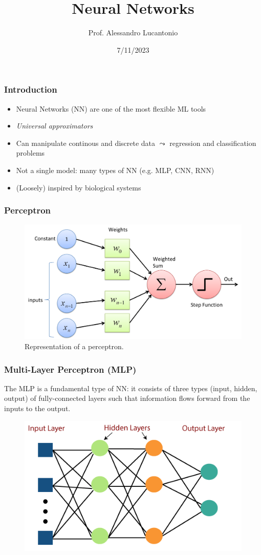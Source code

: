 \documentclass{beamer}
\title{Neural Networks}
\author{Prof. Alessandro Lucantonio}
\institute{Aarhus University}
\date{7/11/2023}
\begin{document}
	\frame{\titlepage}
	
	\begin{frame}
		\frametitle{Introduction}
		\begin{itemize}
			\setlength\itemsep{5mm}
			\item Neural Networks (NN) are one of the most flexible ML tools
			\item \textit{Universal approximators}
			\item Can manipulate continous and discrete data $\leadsto$ regression and classification problems
			\item Not a single model: many types of NN (e.g. MLP, CNN, RNN)
			\item (Loosely) inspired by biological systems
		\end{itemize}
	\end{frame}

	\begin{frame}
	\frametitle{Perceptron}
	\begin{figure}
		\centering
		\includegraphics[scale=0.2]{images/perceptron}
		\caption{Representation of a perceptron.}
	\end{figure}
\end{frame}


	\begin{frame}
		\frametitle{Multi-Layer Perceptron (MLP)}
		The MLP is a fundamental type of NN: it consists of three types (input, hidden, output) of fully-connected layers such that information flows forward from the inputs to the output.
		\begin{figure}
			\centering
			\includegraphics[scale=0.35]{images/mlp-visualization}
		\end{figure}
	\end{frame}
\end{document}
